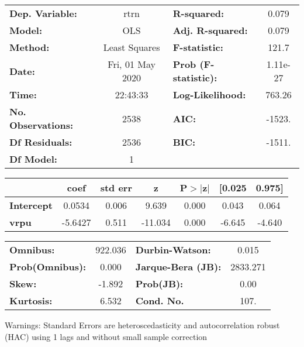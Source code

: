 \begin{center}
\begin{tabular}{lclc}
\toprule
\textbf{Dep. Variable:}    &       rtrn       & \textbf{  R-squared:         } &     0.079   \\
\textbf{Model:}            &       OLS        & \textbf{  Adj. R-squared:    } &     0.079   \\
\textbf{Method:}           &  Least Squares   & \textbf{  F-statistic:       } &     121.7   \\
\textbf{Date:}             & Fri, 01 May 2020 & \textbf{  Prob (F-statistic):} &  1.11e-27   \\
\textbf{Time:}             &     22:43:33     & \textbf{  Log-Likelihood:    } &    763.26   \\
\textbf{No. Observations:} &        2538      & \textbf{  AIC:               } &    -1523.   \\
\textbf{Df Residuals:}     &        2536      & \textbf{  BIC:               } &    -1511.   \\
\textbf{Df Model:}         &           1      & \textbf{                     } &             \\
\bottomrule
\end{tabular}
\begin{tabular}{lcccccc}
                   & \textbf{coef} & \textbf{std err} & \textbf{z} & \textbf{P$> |$z$|$} & \textbf{[0.025} & \textbf{0.975]}  \\
\midrule
\textbf{Intercept} &       0.0534  &        0.006     &     9.639  &         0.000        &        0.043    &        0.064     \\
\textbf{vrpu}      &      -5.6427  &        0.511     &   -11.034  &         0.000        &       -6.645    &       -4.640     \\
\bottomrule
\end{tabular}
\begin{tabular}{lclc}
\textbf{Omnibus:}       & 922.036 & \textbf{  Durbin-Watson:     } &    0.015  \\
\textbf{Prob(Omnibus):} &   0.000 & \textbf{  Jarque-Bera (JB):  } & 2833.271  \\
\textbf{Skew:}          &  -1.892 & \textbf{  Prob(JB):          } &     0.00  \\
\textbf{Kurtosis:}      &   6.532 & \textbf{  Cond. No.          } &     107.  \\
\bottomrule
\end{tabular}
\end{center}

Warnings: \newline
 [1] Standard Errors are heteroscedasticity and autocorrelation robust (HAC) using 1 lags and without small sample correction